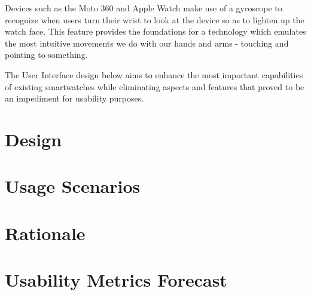 \documentclass{article}
\begin{document}
Devices such as the Moto 360 and Apple Watch make use of a gyroscope to recognize when users turn their wrist to look at the device so as to lighten up the watch face. This feature provides the foundations for a technology which emulates the most intuitive movements we do with our hands and arms - touching and pointing to something. 

The User Interface design below aims to enhance the most important capabilities of existing smartwatches while eliminating aspects and features that proved to be an impediment for usability purposes.

\section{Design}
\section{Usage Scenarios}
\section{Rationale}
\section{Usability Metrics Forecast}



\end{document}
